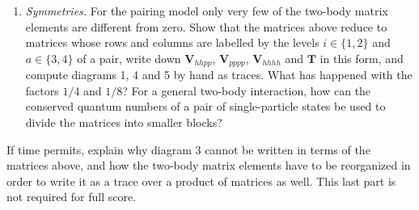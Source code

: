 \documentclass[prc]{revtex4}
\begin{document}
\begin{enumerate}
\begin{enumerate}
  pairs are included, that is both $(ij)$ and $(ji)$. Show that
  diagram 1 in Fig.~\ref{fig:diagrams} can be written as a trace over
  a product of matrices, as discussed in the lectures of week 45,
\begin{equation}
\text{diagram 1}=\frac{1}{4}\operatorname{Tr}\left(\bm{V}_{hhpp}\bm{T}\right).
\label{eq:e2trace}
\end{equation}
  This is the complete second-order correction $E^{(2)}$ only when
  diagram 2 vanishes. Write down the expression for diagram 2, which
  has to be added in the general case. What happens with the factor
  $1/4$ if only one ordering of each pair is kept, $i<j$ and $a<b$?
  Define in the same way the matrices $\bm{V}_{pppp}$ and
  $\bm{V}_{hhhh}$ and write diagrams 4 and 5 as traces over products
  of three matrices, using $\bm{T}$ and its Hermitian conjugate
  $\bm{T}^\dagger$. If $n_h$ is the number of hole states and $n_p$
  the number of particle states, how does the number of operations
  needed for diagrams 1, 4 and 5 grow with $n_h$ and $n_p$? Note that
  a trace needs only the diagonal elements of a product. Compare with
  the growth of the number of Slater determinants. What is gained, and
  what is not gained, by writing the diagrams as products of matrices?
\item \emph{Symmetries.} For the pairing model only very few of the
  two-body matrix elements are different from zero. Show that the
  matrices above reduce to matrices whose rows and columns are
  labelled by the levels $i\in\{1,2\}$ and $a\in\{3,4\}$ of a pair,
  write down $\bm{V}_{hhpp}$, $\bm{V}_{pppp}$, $\bm{V}_{hhhh}$ and
  $\bm{T}$ in this form, and compute diagrams 1, 4 and 5 by hand as
  traces. What has happened with the factors $1/4$ and $1/8$? For a
  general two-body interaction, how can the conserved quantum numbers
  of a pair of single-particle states be used to divide the matrices
  into smaller blocks?
\end{enumerate}
If time permits, explain why diagram 3 cannot be written in terms of
the matrices above, and how the two-body matrix elements have to be
reorganized in order to write it as a trace over a product of matrices
as well. This last part is not required for full score.


\end{enumerate}
\end{document}
